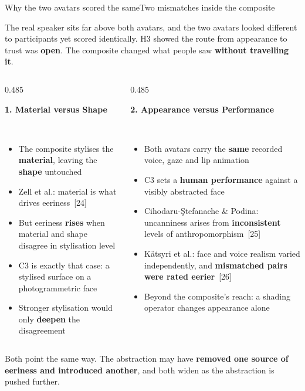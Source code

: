 \documentclass[aspectratio=169,10pt]{beamer}
\newcommand{\hl}[1]{{\color{knblue}\textbf{#1}}}
\newcommand{\bad}[1]{{\color{knred}\textbf{#1}}}
\newcommand{\panelhead}[1]{\noindent\colorbox{kncyan}{\parbox{0.96\textwidth}{\centering\vspace{1pt}\color{white}\scriptsize\bfseries #1\vspace{1pt}}}\\[0.25em]}
\newcommand{\panel}[1]{\noindent\colorbox{knlight}{\parbox{0.96\textwidth}{\vspace{2pt}\scriptsize
\begin{itemize}\setlength{\itemsep}{0.2em}\setlength{\leftmargini}{1.1em}#1\end{itemize}\vspace{2pt}}}}
\begin{document}
\begin{frame}{Why the two avatars scored the same}{Two mismatches inside the composite}
  \vspace{0.3em}
  \noindent\colorbox{knlight}{\parbox{0.975\textwidth}{\scriptsize\color{knblue}
  The real speaker sits far above both avatars, and the two avatars looked different to participants yet scored identically. H3 showed the route from appearance to trust was \textbf{open}. The composite changed what people saw \textbf{without travelling it}.}}
  \vspace{0.7em}

  \begin{columns}[T]
    \begin{column}{0.485\textwidth}
      \panelhead{1. Material versus Shape}
      \panel{%
        \item The composite stylises the \hl{material}, leaving the \hl{shape} untouched
        \item Zell et al.: material is what drives eeriness~[24]
        \item But eeriness \bad{rises} when material and shape disagree in stylisation level
        \item C3 is exactly that case: a stylised surface on a photogrammetric face
        \item Stronger stylisation would only \bad{deepen} the disagreement}
    \end{column}
    \begin{column}{0.485\textwidth}
      \panelhead{2. Appearance versus Performance}
      \panel{%
        \item Both avatars carry the \hl{same} recorded voice, gaze and lip animation
        \item C3 sets a \hl{human performance} against a visibly abstracted face
        \item Cihodaru-\c{S}tefanache \& Podina: uncanniness arises from \hl{inconsistent} levels of anthropomorphism~[25]
        \item K\"atsyri et al.: face and voice realism varied independently, and \bad{mismatched pairs were rated eerier}~[26]
        \item Beyond the composite's reach: a shading operator changes appearance alone}
    \end{column}
  \end{columns}
  \vfill
  \noindent\colorbox{knlight}{\parbox{0.975\textwidth}{\scriptsize\color{knblue}
  Both point the same way. The abstraction may have \textbf{removed one source of eeriness and introduced another}, and both widen as the abstraction is pushed further.}}
\end{frame}
\end{document}

